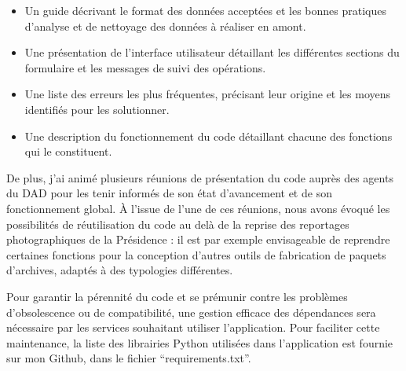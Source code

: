\begin{itemize}
	\item Un guide décrivant le format des données acceptées et les bonnes pratiques d'analyse et de nettoyage des données à réaliser en amont.
	\item Une présentation de l'interface utilisateur détaillant les différentes sections du formulaire et les messages de suivi des opérations.
	\item Une liste des erreurs les plus fréquentes, précisant leur origine et les moyens identifiés pour les solutionner.
	\item Une description du fonctionnement du code détaillant chacune des fonctions qui le constituent.
\end{itemize}

De plus, j'ai animé plusieurs réunions de présentation du code auprès des agents du DAD pour les tenir informés de son état d'avancement et de son fonctionnement global. À l'issue de l'une de ces réunions, nous avons évoqué les possibilités de réutilisation du code au delà de la reprise des reportages photographiques de la Présidence : il est par exemple envisageable de reprendre certaines fonctions pour la conception d'autres outils de fabrication de paquets d'archives, adaptés à des typologies différentes.

Pour garantir la pérennité du code et se prémunir contre les problèmes d'obsolescence ou de compatibilité, une gestion efficace des dépendances sera nécessaire par les services souhaitant utiliser l'application. Pour faciliter cette maintenance, la liste des librairies Python utilisées dans l'application est fournie sur mon Github, dans le fichier \enquote{requirements.txt}.
\\

